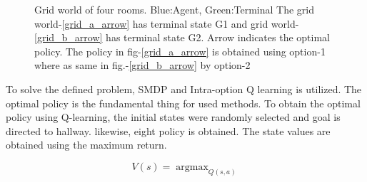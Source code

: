 \documentclass[preprint,12pt]{elsarticle}
\DeclareMathOperator*{\argmax}{argmax}
\begin{document}
\begin{figure}[H]
	\centering  
	\caption{Grid world of four rooms.  Blue:Agent, Green:Terminal The grid world-\ref{grid_a_arrow} has terminal state G1 and grid world-\ref{grid_b_arrow} has terminal state G2. Arrow indicates the optimal policy. The policy in fig-\ref{grid_a_arrow} is obtained using option-1 where as same in fig.-\ref{grid_b_arrow} by option-2 }
	\label{fig:grids}
\end{figure}



To solve the defined problem, SMDP and Intra-option Q learning is utilized. The optimal policy is the fundamental thing for used methods. To obtain the optimal policy using Q-learning, the initial states were randomly selected and goal is directed to hallway. likewise, eight policy is obtained. The state values are obtained using the maximum return.

\begin{equation}
	V(s) = \argmax_{Q(s,a)} 
\end{equation}
\end{document}
